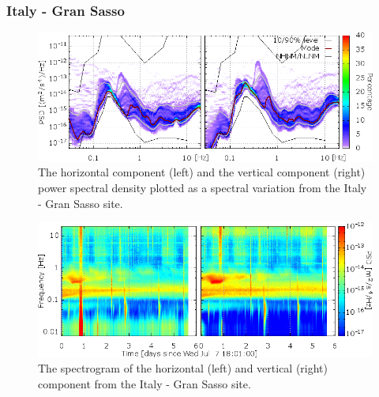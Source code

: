 \subsubsection*{Italy - Gran Sasso}
\begin{figure}[h]
\centering
\includegraphics[width=\textwidth]{./Sec_SiteInfra/Figures/results/GSasso-A_multiplot1}
\caption{The horizontal component (left) and the vertical component (right) power spectral density plotted as a spectral variation from the Italy - Gran Sasso site.}
\label{fig:GSasso-A_multiplot1}
\end{figure}\begin{figure}[h]
\centering
\includegraphics[width=\textwidth]{./Sec_SiteInfra/Figures/results/GSasso-A_multiplot2}
\caption{The spectrogram of the horizontal (left) and vertical (right) component from the Italy - Gran Sasso site.}
\label{fig:GSasso-A_multiplot2}
\end{figure}

\pagebreak
\FloatBarrier
